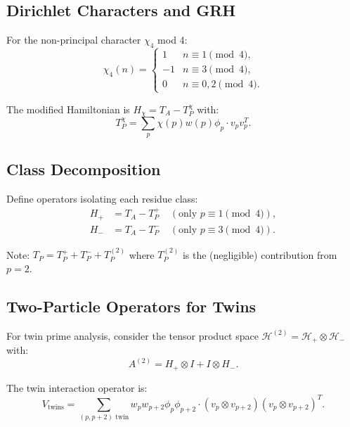 \documentclass[11pt,a4paper]{article}
\theoremstyle{definition}
\begin{document}
\subsection{Dirichlet Characters and GRH}

For the non-principal character $\chi_4$ mod 4:
\begin{equation}
\chi_4(n) = \begin{cases}
1 & n \equiv 1 \pmod{4}, \\
-1 & n \equiv 3 \pmod{4}, \\
0 & n \equiv 0,2 \pmod{4}.
\end{cases}
\end{equation}

The modified Hamiltonian is $H_\chi = T_A - T_P^\chi$ with:
\begin{equation}
T_P^\chi = \sum_p \chi(p) w(p) \phi_p \cdot v_p v_p^T.
\end{equation}

\subsection{Class Decomposition}

Define operators isolating each residue class:
\begin{align}
H_+ &= T_A - T_P^+ \quad (\text{only } p \equiv 1 \pmod{4}), \\
H_- &= T_A - T_P^- \quad (\text{only } p \equiv 3 \pmod{4}).
\end{align}

Note: $T_P = T_P^+ + T_P^- + T_P^{(2)}$ where $T_P^{(2)}$ is the (negligible) contribution from $p=2$.

\subsection{Two-Particle Operators for Twins}

For twin prime analysis, consider the tensor product space $\mathcal{H}^{(2)} = \mathcal{H}_+ \otimes \mathcal{H}_-$ with:
\begin{equation}
A^{(2)} = H_+ \otimes I + I \otimes H_-.
\end{equation}

The twin interaction operator is:
\begin{equation}
V_{\text{twins}} = \sum_{(p,p+2) \text{ twin}} w_p w_{p+2} \phi_p \phi_{p+2} \cdot (v_p \otimes v_{p+2})(v_p \otimes v_{p+2})^T.
\end{equation}
\end{document}
